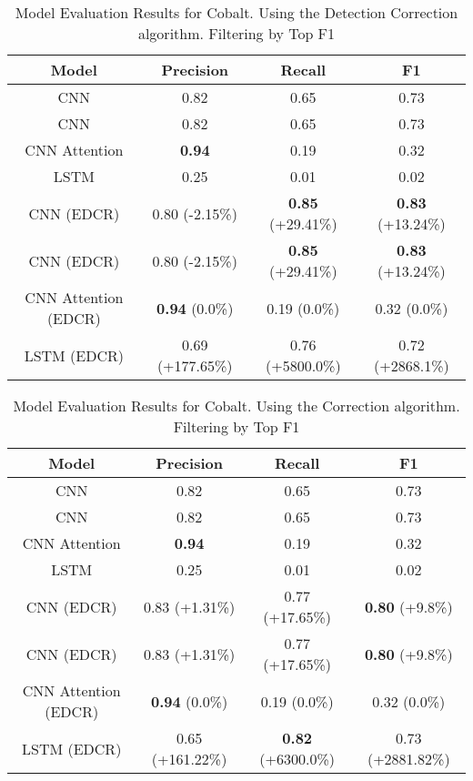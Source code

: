 \begin{table}
\centering
\begin{tabular}{|c|c|c|c|}
\hline
Model & Precision & Recall & F1\\
\hline
CNN  & 0.82 & 0.65 & 0.73\\
CNN  & 0.82 & 0.65 & 0.73\\
CNN Attention & \textbf{0.94} & 0.19 & 0.32\\
LSTM  & 0.25 & 0.01 & 0.02\\

\hline
CNN  (EDCR) & 0.80 (-2.15\%) & \textbf{0.85} (+29.41\%) & \textbf{0.83} (+13.24\%)\\
CNN  (EDCR) & 0.80 (-2.15\%) & \textbf{0.85} (+29.41\%) & \textbf{0.83} (+13.24\%)\\
CNN Attention (EDCR) & \textbf{0.94} (0.0\%) & 0.19 (0.0\%) & 0.32 (0.0\%)\\
LSTM  (EDCR) & 0.69 (+177.65\%) & 0.76 (+5800.0\%) & 0.72 (+2868.1\%)\\

\hline
\end{tabular}
\caption{Model Evaluation Results for Cobalt. Using the Detection Correction algorithm. Filtering by Top F1}
\end{table}
\begin{table}
\centering
\begin{tabular}{|c|c|c|c|}
\hline
Model & Precision & Recall & F1\\
\hline
CNN  & 0.82 & 0.65 & 0.73\\
CNN  & 0.82 & 0.65 & 0.73\\
CNN Attention & \textbf{0.94} & 0.19 & 0.32\\
LSTM  & 0.25 & 0.01 & 0.02\\

\hline
CNN  (EDCR) & 0.83 (+1.31\%) & 0.77 (+17.65\%) & \textbf{0.80} (+9.8\%)\\
CNN  (EDCR) & 0.83 (+1.31\%) & 0.77 (+17.65\%) & \textbf{0.80} (+9.8\%)\\
CNN Attention (EDCR) & \textbf{0.94} (0.0\%) & 0.19 (0.0\%) & 0.32 (0.0\%)\\
LSTM  (EDCR) & 0.65 (+161.22\%) & \textbf{0.82} (+6300.0\%) & 0.73 (+2881.82\%)\\

\hline
\end{tabular}
\caption{Model Evaluation Results for Cobalt. Using the Correction algorithm. Filtering by Top F1}
\end{table}
